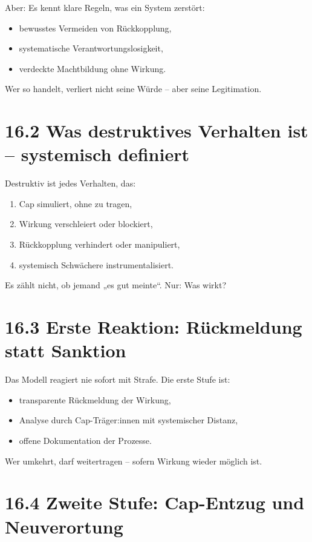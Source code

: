 \documentclass[12pt,a4paper]{book}
\begin{document}
Aber:  
Es kennt klare Regeln, was ein System zerstört:

\begin{itemize}
    \item bewusstes Vermeiden von Rückkopplung,
    \item systematische Verantwortungslosigkeit,
    \item verdeckte Machtbildung ohne Wirkung.
\end{itemize}

Wer so handelt, verliert nicht seine Würde –  
aber seine Legitimation.

\section*{16.2 Was destruktives Verhalten ist – systemisch definiert}

Destruktiv ist jedes Verhalten, das:

\begin{enumerate}
    \item Cap simuliert, ohne zu tragen,
    \item Wirkung verschleiert oder blockiert,
    \item Rückkopplung verhindert oder manipuliert,
    \item systemisch Schwächere instrumentalisiert.
\end{enumerate}

Es zählt nicht, ob jemand „es gut meinte“.  
Nur: Was wirkt?

\section*{16.3 Erste Reaktion: Rückmeldung statt Sanktion}

Das Modell reagiert nie sofort mit Strafe.  
Die erste Stufe ist:

\begin{itemize}
    \item transparente Rückmeldung der Wirkung,
    \item Analyse durch Cap-Träger:innen mit systemischer Distanz,
    \item offene Dokumentation der Prozesse.
\end{itemize}

Wer umkehrt, darf weitertragen – sofern Wirkung wieder möglich ist.

\section*{16.4 Zweite Stufe: Cap-Entzug und Neuverortung}
\end{document}
